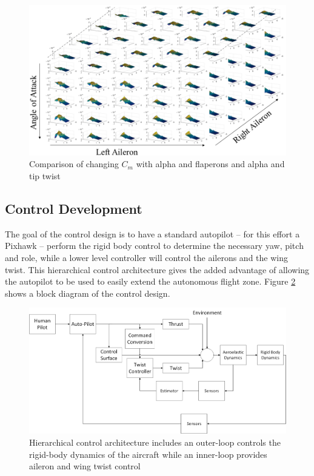 \documentclass[11pt]{ucthesis}
\begin{document}
\begin{figure}[thpb]
\centering
\includegraphics[width=1\linewidth]{Figures/DataCube.png}
\caption{Comparison of changing $C_m$ with alpha and flaperons and alpha and tip twist}
\label{fig:ADataCube}
\end{figure}

\subsection{Control Development}
The goal of the control design is to have a standard autopilot – for this effort a Pixhawk – perform the rigid body control to determine the necessary yaw, pitch and role, while a lower level controller will control the ailerons and the wing twist. This hierarchical control architecture gives the added advantage of allowing the autopilot to be used to easily extend the autonomous flight zone. Figure \ref{fig:AControlBlockDiag} shows a block diagram of the control design.

\begin{figure}[thpb]
\centering
\includegraphics[width=1\linewidth]{Figures/Phase1Control.png}
\caption{Hierarchical control architecture includes an outer-loop controls the rigid-body dynamics of the aircraft while an inner-loop provides aileron and wing twist control}
\label{fig:AControlBlockDiag}
\end{figure}
\end{document}

